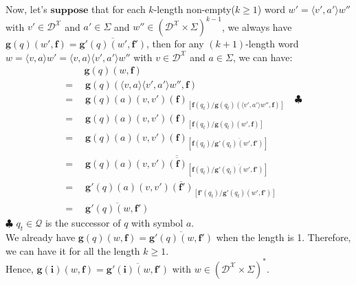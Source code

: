 \documentclass[a4paper, 11pt]{article}
\begin{document}
	Now, let's $\bm{suppose}$ that for each $k$-length non-empty($k \geq 1$) word $w' = \langle v', a' \rangle w''$ with $v' \in \mathcal{D}^{\mathcal{X}}$ and $a' \in \Sigma$ and $w'' \in (\mathcal{D}^{\mathcal{X}} \times \Sigma)^{k-1}$, we always have $\bm{g}(q)(w', \bm{f}) = \overline{\bm{g}'(q)(w', \bm{f}')}$, then for any $(k+1)$-length word $w = \langle v, a \rangle w' = \langle v, a \rangle \langle v', a' \rangle w''$ with $v \in \mathcal{D}^{\mathcal{X}}$ and $a \in \Sigma$, we can have:
	\begin{align*}
		&\qquad\ \bm{g}(q)(w, \bm{f})\\
		&= \quad \bm{g}(q)(\langle v, a \rangle \langle v', a' \rangle w'', \bm{f})\\
		&= \quad \bm{g}(q)(a)(v, v')(\bm{f})_{[\bm{f}(q_t) / \bm{g}(q_t)(\langle v', a' \rangle w'', \bm{f})]} \quad \clubsuit\\
		&= \quad \bm{g}(q)(a)(v, v')(\bm{f})_{[\bm{f}(q_t) / \bm{g}(q_t)(w', \bm{f})]}\\
		&= \quad \bm{g}(q)(a)(v, v')(\bm{f})_{[\bm{f}(q_t) / \overline{\bm{g}'(q_t)(w', \bm{f}')}]}\\
		&= \quad \overline{\overline{\bm{g}(q)(a)(v, v')(\bm{f})_{[\bm{f}(q_t) / \overline{\bm{g}'(q_t)(w', \bm{f}')}]}}}\\
		&= \quad \overline{\bm{g}'(q)(a)(v, v')(\bm{f}')_{[\bm{f}'(q_t) / \bm{g}'(q_t)(w', \bm{f}')]}}\\
		&= \quad \overline{\bm{g}'(q)(w, \bm{f}')}
	\end{align*}
	$\clubsuit$ $q_t \in \mathcal{Q}$ is the successor of $q$ with symbol $a$.\\
	
	We already have $\bm{g}(q)(w, \bm{f}) = \overline{\bm{g}'(q)(w, \bm{f}')}$ when the length is 1. Therefore, we can have it for all the length $k \geq 1$.\\
	
	Hence, $\bm{g}(\bm{i})(w, \bm{f}) = \overline{\bm{g}'(\bm{i})(w, \bm{f}')}$ with $w \in (\mathcal{D}^{\mathcal{X}} \times \Sigma)^*$.
\end{document}
